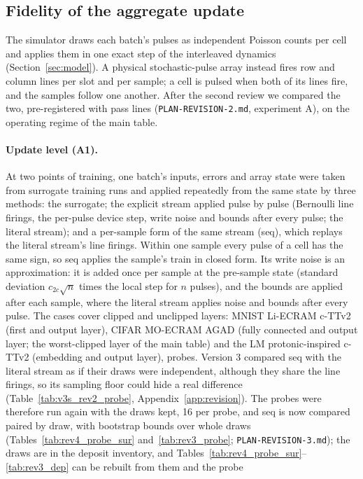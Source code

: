 \subsection{Fidelity of the aggregate update}\label{sec:fidelity}
The simulator draws each batch's pulses as independent Poisson counts per cell and applies them in one exact step of the
interleaved dynamics (Section~\ref{sec:model}). A physical stochastic-pulse array instead fires row and column lines per slot
and per sample; a cell is pulsed when both of its lines fire, and the samples follow one another. After the second review we
compared the two, pre-registered with pass lines (\texttt{PLAN-REVISION-2.md}, experiment A), on the operating regime of the
main table.

\paragraph{Update level (A1).} At two points of training, one batch's inputs, errors and array state were taken from surrogate
training runs and applied repeatedly from the same state by three methods: the surrogate; the explicit stream applied pulse by
pulse (Bernoulli line firings, the per-pulse device step, write noise and bounds after every pulse; the literal stream); and a
per-sample form of the same stream (seq), which replays the literal stream's line firings. Within one sample every pulse of a
cell has the same sign, so seq applies the sample's train in closed form. Its write noise is an approximation: it is added once
per sample at the pre-sample state (standard deviation $c_{2c}\sqrt{n}$ times the local step for $n$ pulses), and the bounds are
applied after each sample, where the literal stream applies noise and bounds after every pulse. The cases cover clipped and
unclipped layers: MNIST Li-ECRAM c-TTv2 (first and output layer), CIFAR MO-ECRAM AGAD (fully connected and output layer; the
worst-clipped layer of the main table) and the LM protonic-inspired c-TTv2 (embedding and output layer), \RYProbeN{} probes.
Version 3 compared seq with the literal stream as if their draws were independent, although they share the line firings, so
its sampling floor could hide a real difference (Table~\ref{tab:v3s_rev2_probe}, Appendix~\ref{app:revision}). The probes were
therefore run again with the draws kept, 16 per probe, and seq is now compared paired by draw, with bootstrap bounds over whole
draws (Tables~\ref{tab:rev4_probe_sur} and~\ref{tab:rev3_probe}; \texttt{PLAN-REVISION-3.md}); the draws are in
the deposit inventory, and Tables~\ref{tab:rev4_probe_sur}--\ref{tab:rev3_dep} can be rebuilt from them and the probe
